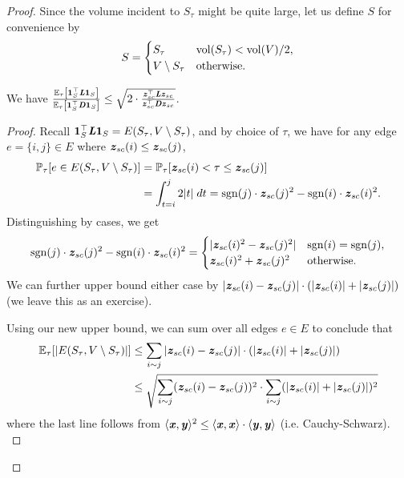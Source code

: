 \begin{proof}
Since the volume incident to $S_{\tau}$ might be quite large, let us define $S$ for convenience by
\[
S = \begin{cases}
        S_{\tau} & \operatorname{vol}(S_{\tau}) < \operatorname{vol}(V)/2,
        \\
        V \setminus S_{\tau} &\text{otherwise}.
        \end{cases}
\]

\begin{claim}\label{clm:cheegersInequInExpectation}
We have  $\frac{\mathbb{E}_{\tau}\left[\boldsymbol{1}_S^\top \boldsymbol{\mathit{L}} \boldsymbol{1}_S\right]}{\mathbb{E}_{\tau}\left[{\boldsymbol{1}_S^\top \boldsymbol{\mathit{D}} \boldsymbol{1}_S}  \right]} \leq \sqrt{2 \cdot \frac{\boldsymbol{\mathit{z}}_{sc}^\top \boldsymbol{\mathit{L}} \boldsymbol{\mathit{z}}_{sc}}{\boldsymbol{\mathit{z}}_{sc}^\top \boldsymbol{\mathit{D}} \boldsymbol{\mathit{z}}_{sc}}}$.
\end{claim}
\begin{proof}
Recall $\boldsymbol{1}_S^\top \boldsymbol{\mathit{L}} \boldsymbol{1}_S = E(S_{\tau}, V \setminus S_{\tau})$, and by choice of $\tau$, we have for any edge $e = \{i,j\} \in E$ where $\boldsymbol{\mathit{z}}_{sc}(i) \leq \boldsymbol{\mathit{z}}_{sc}(j)$,
\begin{align*}
    \mathbb{P}_{\tau}[e \in E(S_{\tau}, V \setminus S_{\tau})] &= \mathbb{P}_{\tau}[\boldsymbol{\mathit{z}}_{sc}(i) < \tau \leq \boldsymbol{\mathit{z}}_{sc}(j)] \\ &= \int_{t=i}^j 2|t|\; dt = \mathrm{sgn} (j) \cdot \boldsymbol{\mathit{z}}_{sc}(j)^2 - \mathrm{sgn} (i) \cdot \boldsymbol{\mathit{z}}_{sc}(i)^2.
\end{align*}
Distinguishing by cases, we get
\[
\mathrm{sgn} (j) \cdot \boldsymbol{\mathit{z}}_{sc}(j)^2 - \mathrm{sgn} (i) \cdot \boldsymbol{\mathit{z}}_{sc}(i)^2 = \begin{cases}
    |\boldsymbol{\mathit{z}}_{sc}(i)^2 - \boldsymbol{\mathit{z}}_{sc}(j)^2| & \mathrm{sgn} (i) = \mathrm{sgn} (j),
    \\
    \boldsymbol{\mathit{z}}_{sc}(i)^2 + \boldsymbol{\mathit{z}}_{sc}(j)^2 &\text{otherwise}.
    \end{cases} 
\]
We can further upper bound either case by $ |\boldsymbol{\mathit{z}}_{sc}(i) - \boldsymbol{\mathit{z}}_{sc}(j)| \cdot (|\boldsymbol{\mathit{z}}_{sc}(i)| + |\boldsymbol{\mathit{z}}_{sc}(j)|)$ (we leave this as an exercise).

Using our new upper bound, we can sum over all edges $e \in E$ to conclude that
\begin{align*}
   \mathbb{E}_{\tau}[|E(S_{\tau}, V \setminus S_{\tau})|] &\leq \sum_{i \sim j} |\boldsymbol{\mathit{z}}_{sc}(i) - \boldsymbol{\mathit{z}}_{sc}(j)| \cdot (|\boldsymbol{\mathit{z}}_{sc}(i)| + |\boldsymbol{\mathit{z}}_{sc}(j)|) \\
   &\leq \sqrt{\sum_{i \sim j} (\boldsymbol{\mathit{z}}_{sc}(i) - \boldsymbol{\mathit{z}}_{sc}(j))^2 \cdot \sum_{i \sim j} (|\boldsymbol{\mathit{z}}_{sc}(i)| + |\boldsymbol{\mathit{z}}_{sc}(j)|)^2 }
\end{align*}
where the last line follows from $\langle \boldsymbol{\mathit{x}}, \boldsymbol{\mathit{y}} \rangle^2 \leq \langle \boldsymbol{\mathit{x}}, \boldsymbol{\mathit{x}} \rangle \cdot \langle \boldsymbol{\mathit{y}}, \boldsymbol{\mathit{y}} \rangle$ (i.e. Cauchy-Schwarz).\\


\end{proof}
\end{proof}
